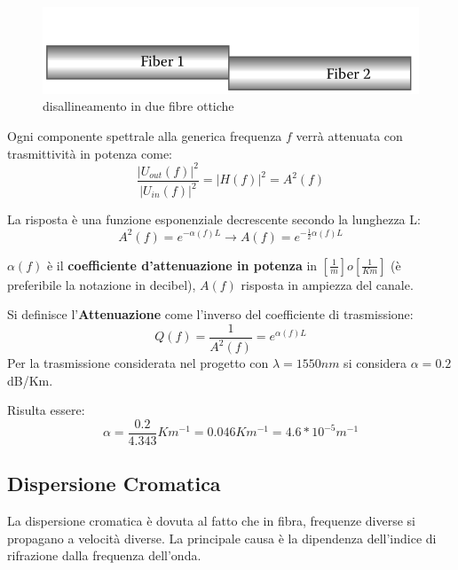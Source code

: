 \documentclass[12pt, a4paper]{article}
\begin{document}
\begin{figure}[h!]
\centering
\includegraphics[scale=0.4]{splicing.png}
\caption{disallineamento in due fibre ottiche}
\end{figure}

Ogni componente spettrale alla generica frequenza $f$ verrà attenuata con trasmittività in potenza come:
\begin{equation}
	\frac{|U_{out}(f)|^2}{|U_{in}(f)|^2} = |H(f)|^2 = A^2(f)
\end{equation}

La risposta è una funzione esponenziale decrescente secondo la lunghezza L:
\begin{equation}
	A^2(f) = e^{-\alpha(f)L}  \rightarrow A(f) = e^{-\frac{1}{2}\alpha(f)L}
\end{equation}

$\alpha(f)$ è il \textbf{coefficiente d'attenuazione in potenza} in $[\frac{1}{m}]  o [\frac{1}{Km}]$  (è preferibile la notazione in decibel), $A(f)$ risposta in ampiezza del canale.


Si definisce l'\textbf{Attenuazione} come l'inverso del coefficiente di trasmissione:
\begin{equation}\label{Q_eq}
	Q(f) = \frac{1}{A^2(f)} = e^{\alpha(f)L}
\end{equation}
Per la trasmissione considerata nel progetto con $\lambda = 1550 nm$ si considera $\alpha = 0.2 $ dB/Km.

Risulta essere:
\begin{equation}
	\alpha = \frac{0.2}{4.343} Km^{-1} = 0.046 Km^{-1} = 4.6*10^{-5} m^{-1}
\end{equation}


\vspace{10mm}
\subsection{Dispersione Cromatica}
\label{sub:dispersione}

La dispersione cromatica è dovuta al fatto che in fibra, frequenze diverse si propagano a velocità diverse. La principale causa è la dipendenza dell’indice di rifrazione dalla frequenza dell'onda.
\end{document}
